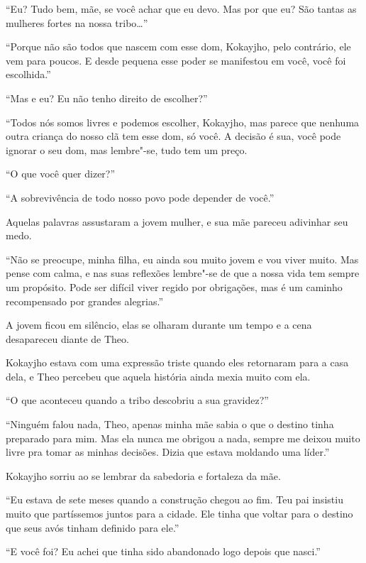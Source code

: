 ``Eu? Tudo bem, mãe, se você achar que eu devo. Mas por que eu? São
tantas as mulheres fortes na nossa tribo\ldots{}''

``Porque não são todos que nascem com esse dom, Kokayjho, pelo
contrário, ele vem para poucos. E desde pequena esse poder se manifestou
em você, você foi escolhida.''

``Mas e eu? Eu não tenho direito de escolher?''

``Todos nós somos livres e podemos escolher, Kokayjho, mas parece que
nenhuma outra criança do nosso clã tem esse dom, só você. A decisão é
sua, você pode ignorar o seu dom, mas lembre"-se, tudo tem um preço.

``O que você quer dizer?''

``A sobrevivência de todo nosso povo pode depender de você.''

Aquelas palavras assustaram a jovem mulher, e sua mãe pareceu adivinhar
seu medo.

``Não se preocupe, minha filha, eu ainda sou muito jovem e vou viver
muito. Mas pense com calma, e nas suas reflexões lembre"-se de que a nossa
vida tem sempre um propósito. Pode ser difícil viver regido por
obrigações, mas é um caminho recompensado por grandes alegrias.''

A jovem ficou em silêncio, elas se olharam durante um tempo e a cena
desapareceu diante de Theo.

\asterisc


Kokayjho estava com uma expressão triste quando eles retornaram para a
casa dela, e Theo percebeu que aquela história ainda mexia muito com ela.

``O que aconteceu quando a tribo descobriu a sua gravidez?''

``Ninguém falou nada, Theo, apenas minha mãe sabia o que o destino tinha
preparado para mim. Mas ela nunca me obrigou a nada, sempre me deixou
muito livre pra tomar as minhas decisões. Dizia que estava moldando uma
líder.''

Kokayjho sorriu ao se lembrar da sabedoria e fortaleza da mãe.

``Eu estava de sete meses quando a construção chegou ao fim. Teu pai
insistiu muito que partíssemos juntos para a cidade. Ele tinha que
voltar para o destino que seus avós tinham definido para ele.''

``E você foi? Eu achei que tinha sido abandonado logo depois que
nasci.''

